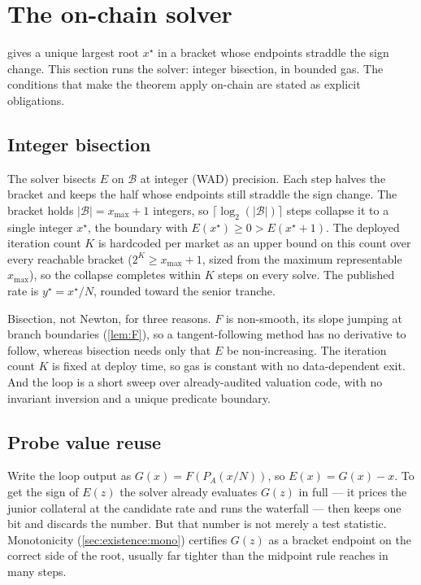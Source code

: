 \section{The on-chain solver}
\label{sec:solver}

 gives a unique largest root $x^\star$ in a bracket whose
endpoints straddle the sign change. This section runs the solver: integer bisection, in bounded gas. The
conditions that make the theorem apply on-chain are stated as explicit
obligations.

\subsection{Integer bisection}
\label{sec:solver:bisection}

The solver bisects $E$ on $\mathcal{B}$ at integer (WAD) precision. Each
step halves the bracket and keeps the half whose endpoints still straddle
the sign change. The bracket holds $\lvert\mathcal{B}\rvert = x_{\max}+1$
integers, so $\lceil \log_2(\lvert\mathcal{B}\rvert) \rceil$ steps
collapse it to a single integer $x^\star$, the boundary with
$E(x^\star) \geq 0 > E(x^\star + 1)$. The deployed iteration count $K$
is hardcoded per market as an upper bound on this count over every
reachable bracket ($2^K \geq x_{\max} + 1$, sized from the maximum
representable $x_{\max}$), so the collapse completes within $K$ steps
on every solve. The published rate is
$y^\star = x^\star / N$, rounded toward the senior tranche.

Bisection, not Newton, for three reasons. $F$ is non-smooth, its slope
jumping at branch boundaries (\cref{lem:F}), so a tangent-following
method has no derivative to follow, whereas bisection needs only that
$E$ be non-increasing. The iteration count $K$ is fixed at deploy time,
so gas is constant with no data-dependent exit. And the loop is a short
sweep over already-audited valuation code, with no invariant inversion
and a unique predicate boundary.

\subsection{Probe value reuse}
\label{sec:solver:reuse}

Write the loop output as $G(x) = F(P_A(x/N))$, so $E(x) = G(x) - x$. To
get the sign of $E(z)$ the solver already evaluates $G(z)$ in full --- it
prices the junior collateral at the candidate rate and runs the
waterfall --- then keeps one bit and discards the number. But that number
is not merely a test statistic. Monotonicity
(\cref{sec:existence:mono}) certifies $G(z)$ as a bracket endpoint on the
correct side of the root, usually far tighter than the midpoint rule
reaches in many steps.

